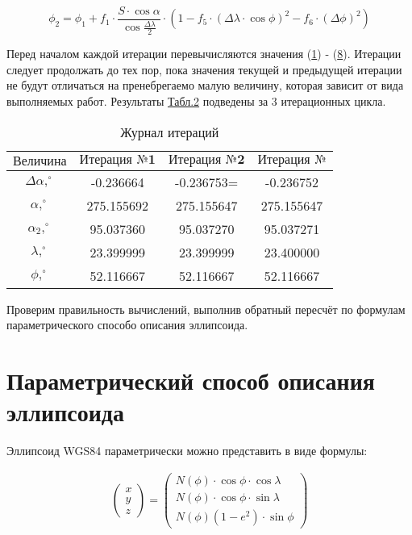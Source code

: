 \documentclass[a4paper,14pt]{article}
\newcommand\indent[1][1cm]{\hspace*{#1}}
\begin{document}
\begin{equation}
    \phi_2 = \phi_1 + f_1 \cdot \frac{S \cdot \cos{\alpha}}{\cos{\frac{\Delta\lambda}{2}}} \cdot \left (1 - f_5 \cdot (\Delta\lambda \cdot \cos{\phi})^2 - f_6 \cdot (\Delta\phi)^2 \right)
\end{equation}

\indent Перед началом каждой итерации перевычисляются значения (\hyperlink{f_1}{1}) - (\hyperlink{f_8}{8}). Итерации следует продолжать до тех пор, пока значения текущей и предыдущей итерации не будут отличаться на пренебрегаемо малую величину, которая зависит от вида выполняемых работ. Результаты \hyperlink{table_2}{Табл.2} подведены за 3 итерационных цикла.

\begin{table}[h]
    \centering
    \hypertarget{table_2}{\caption{Журнал итераций}}
    \begin{tabular}{|c|c|c|c|}
    \hline
         $\textbf{Величина}$ & $\textbf{Итерация №1}$ & $\textbf{Итерация №2}$ & $\textbf{Итерация №}$  \\
         \hline
         $\Delta\alpha, ^\circ$ & -0.236664 & -0.236753=& -0.236752\\
         \hline
         $\alpha, ^\circ$ & 275.155692 & 275.155647 & 275.155647\\
         \hline
         $\alpha_2, ^\circ$ & 95.037360 & 95.037270 & 95.037271\\
         \hline
         $\lambda, ^\circ$ & 23.399999 & 23.399999 & 23.400000\\
         \hline
         $\phi, ^\circ$ & 52.116667 & 52.116667 & 52.116667\\
         \hline
    \end{tabular}
    \label{tab:my_label}
\end{table}

\indent Проверим правильность вычислений, выполнив обратный пересчёт по формулам параметрического способо описания эллипсоида.\\

\newpage
\section{Параметрический способ описания эллипсоида}
Эллипсоид WGS84 параметрически можно представить в виде формулы:

\begin{gather}
    \begin{pmatrix} x \\ y \\ z \end{pmatrix} = 
    \begin{pmatrix}
        N(\phi) \cdot \cos\phi \cdot \cos\lambda\\
        N(\phi) \cdot \cos\phi \cdot \sin\lambda\\
        N(\phi) (1 - e^2) \cdot \sin\phi
    \end{pmatrix}
\end{gather}
\end{document}

